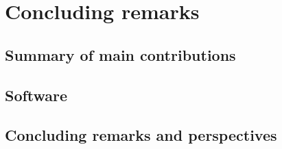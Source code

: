 \chapter{Concluding remarks}

\minitoc

\section{Summary of main contributions}
\section{Software}
\section{Concluding remarks and perspectives}



